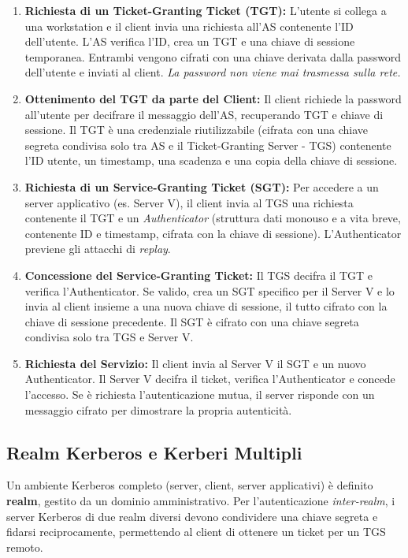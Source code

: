 \begin{enumerate}
    \item \textbf{Richiesta di un Ticket-Granting Ticket (TGT):}
    L'utente si collega a una workstation e il client invia una richiesta all'AS contenente l'ID dell'utente. L'AS verifica l'ID, crea un TGT e una chiave di sessione temporanea. Entrambi vengono cifrati con una chiave derivata dalla password dell'utente e inviati al client. \textit{La password non viene mai trasmessa sulla rete.}
    
    \item \textbf{Ottenimento del TGT da parte del Client:}
    Il client richiede la password all'utente per decifrare il messaggio dell'AS, recuperando TGT e chiave di sessione. Il TGT è una credenziale riutilizzabile (cifrata con una chiave segreta condivisa solo tra AS e il Ticket-Granting Server - TGS) contenente l'ID utente, un timestamp, una scadenza e una copia della chiave di sessione.
    
    \item \textbf{Richiesta di un Service-Granting Ticket (SGT):}
    Per accedere a un server applicativo (es. Server V), il client invia al TGS una richiesta contenente il TGT e un \textit{Authenticator} (struttura dati monouso e a vita breve, contenente ID e timestamp, cifrata con la chiave di sessione). L'Authenticator previene gli attacchi di \textit{replay}.
    
    \item \textbf{Concessione del Service-Granting Ticket:}
    Il TGS decifra il TGT e verifica l'Authenticator. Se valido, crea un SGT specifico per il Server V e lo invia al client insieme a una nuova chiave di sessione, il tutto cifrato con la chiave di sessione precedente. Il SGT è cifrato con una chiave segreta condivisa solo tra TGS e Server V.
    
    \item \textbf{Richiesta del Servizio:}
    Il client invia al Server V il SGT e un nuovo Authenticator. Il Server V decifra il ticket, verifica l'Authenticator e concede l'accesso. Se è richiesta l'autenticazione mutua, il server risponde con un messaggio cifrato per dimostrare la propria autenticità.
\end{enumerate}

\subsection{Realm Kerberos e Kerberi Multipli}
Un ambiente Kerberos completo (server, client, server applicativi) è definito \textbf{realm}, gestito da un dominio amministrativo. Per l'autenticazione \textit{inter-realm}, i server Kerberos di due realm diversi devono condividere una chiave segreta e fidarsi reciprocamente, permettendo al client di ottenere un ticket per un TGS remoto.

